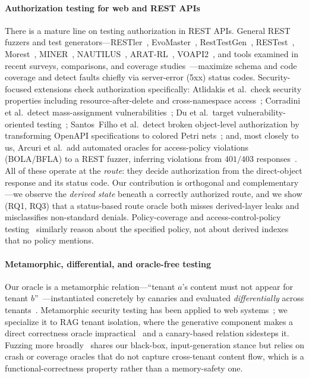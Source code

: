 \IfFileExists{IEEEtran.cls}{\documentclass[conference]{IEEEtran}}{\documentclass[10pt,twocolumn]{article}}
\begin{document}
\paragraph{Authorization testing for web and REST APIs}
There is a mature line on testing authorization in REST APIs. General REST fuzzers and test
generators---RESTler~\cite{atlidakis2019restler}, EvoMaster~\cite{arcuri2019evomaster},
RestTestGen~\cite{viglianisi2020resttestgen}, RESTest~\cite{martinlopez2021restest},
Morest~\cite{liu2022morest}, MINER~\cite{lyu2023miner}, NAUTILUS~\cite{deng2023nautilus},
ARAT-RL~\cite{kim2023aratrl}, VOAPI2~\cite{du2024voapi2}, and tools examined in recent surveys,
comparisons, and coverage
studies~\cite{golmohammadi2023survey,zhang2023openproblems,kim2022notime}---maximize
schema and code coverage and detect faults chiefly via server-error (5xx) status codes.
Security-focused extensions check authorization specifically: Atlidakis et al.\ check security
properties including resource-after-delete and cross-namespace access~\cite{atlidakis2020checking};
Corradini et al.\ detect mass-assignment vulnerabilities~\cite{corradini2023massassign}; Du et al.\
target vulnerability-oriented testing~\cite{du2024voapi2}; Santos~Filho et al.\ detect broken
object-level authorization by transforming OpenAPI specifications to colored Petri
nets~\cite{santos2025bolapetri}; and, most closely to us, Arcuri et al.\ add automated oracles for
access-policy violations (BOLA/BFLA) to a REST fuzzer, inferring violations from $401/403$
responses~\cite{arcuri2025fuzzbola}. All of these operate at the \emph{route}: they decide
authorization from the direct-object response and its status code. Our contribution is orthogonal and
complementary---we observe the \emph{derived state} beneath a correctly authorized route, and we show
(RQ1, RQ3) that a status-based route oracle both misses derived-layer leaks and misclassifies
non-standard denials. Policy-coverage and access-control-policy
testing~\cite{barr2006policycoverage,fisler2005verification} similarly reason about the specified
policy, not about derived indexes that no policy mentions.

\paragraph{Metamorphic, differential, and oracle-free testing}
Our oracle is a metamorphic relation---``tenant $a$'s content must not appear for tenant
$b$''~\cite{chen2018metamorphic,segura2016metamorphic}---instantiated concretely by canaries and
evaluated \emph{differentially} across tenants~\cite{mckeeman1998differential}. Metamorphic security
testing has been applied to web systems~\cite{mai2020metamorphic}; we specialize it to RAG tenant
isolation, where the generative component makes a direct correctness oracle
impractical~\cite{barr2015oracle} and a canary-based relation sidesteps it. Fuzzing more
broadly~\cite{manes2021fuzzing} shares our black-box, input-generation stance but relies on crash or
coverage oracles that do not capture cross-tenant content flow, which is a functional-correctness
property rather than a memory-safety one.
\end{document}

